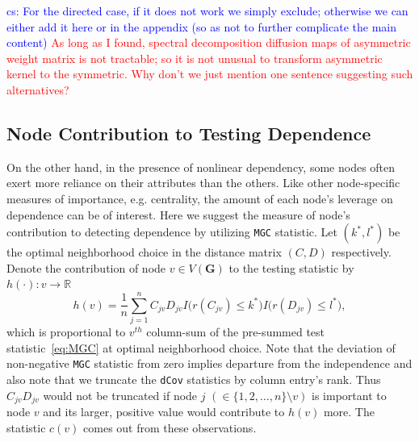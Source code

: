 \documentclass[11pt]{article}
\theoremstyle{definition}
\newcommand{\cs}[1]{\textcolor{blue}{cs: #1}}
\begin{document}
\cs{For the directed case, if it does not work we simply exclude; otherwise we can either add it here or in the appendix (so as not to further complicate the main content)}
\textcolor{red}{As long as I found, spectral decomposition diffusion maps of asymmetric weight matrix is not tractable; so it is not unusual to transform asymmetric kernel to the symmetric. Why don't we just mention one sentence suggesting such alternatives?  }

\subsection{Node Contribution to Testing Dependence}

On the other hand, in the presence of nonlinear dependency, some nodes often exert more reliance on their attributes than the others. Like other node-specific measures of importance, e.g. centrality,  the amount of each node's leverage on dependence can be of interest. Here we suggest the measure of node's contribution to detecting dependence by utilizing \texttt{MGC} statistic. Let $(k^{*}, l^{*})$ be the optimal neighborhood choice in the distance matrix $(C, D)$ respectively. Denote the contribution of node $v \in V(\mathbf{G})$ to the testing statistic by  $h(\cdot) : v \rightarrow \mathbb{R}$
\begin{equation}
\label{eq:contribution}
h(v) =  \frac{1}{n} \sum\limits_{j=1}^{n} C_{j v} D_{j v} I \big(  r (C_{j v}) \leq k^{*}  \big) I \big( r (D_{ j v }) \leq l^{*} \big), 
\end{equation}
which is proportional to $v^{th}$ column-sum of the pre-summed test statistic~\ref{eq:MGC} at optimal neighborhood choice. Note that the deviation of non-negative \texttt{MGC} statistic from zero implies departure from the independence and also note that we truncate the \texttt{dCov} statistics by column entry's rank. Thus $C_{jv} D_{jv}$ would not be truncated if node $j$ $(\in \{ 1,2, \ldots, n \} \setminus v )$ is important to node $v$ and its larger, positive value would contribute to $h(v)$ more. The statistic $c(v)$ comes out from these observations. 
\end{document}
